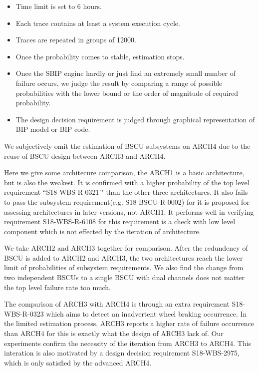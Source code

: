 \begin{itemize}
	\item Time limit is set to 6 hours.
	\item Each trace contains at least a system execution cycle.
	\item Traces are repeated in groups of 12000.
	\item Once the probability comes to stable, estimation stops.
	\item Once the SBIP engine hardly or just find an extremely small number of failure occurs, we judge the result by comparing a range of possible probabilities with the lower bound or the order of magnitude of required probability.  
	\item The design decision requirement is judged through graphical representation of BIP model or BIP code.
\end{itemize}

We subjectively omit the estimation of BSCU subsystems on ARCH4 due to the reuse of BSCU design between ARCH3 and ARCH4.

Here we give some architecure comparison, the ARCH1 is a basic architecture, but is also the weakest. It is confirmed with a higher probability of the top level requirement ``S18-WBS-R-0321'" than the other three architectures. It also fails to pass the subsystem requirement(e.g. S18-BSCU-R-0002) for it is proposed for assessing architectures in later versions, not ARCH1. It performs well in verifying requirement S18-WBS-R-6108 for this requirement is a check with low level component which is not effected by the iteration of architecture.

We take ARCH2 and ARCH3 together for comparison. After the redundency of BSCU is added to ARCH2 and ARCH3, the two architectures reach the lower limit of probabilities of subsystem requirements. We also find the change from two independent BSCUs to a single BSCU with dual channels does not matter the top level failure rate too much.

The comparison of ARCH3 with ARCH4 is through an extra requirement S18-WBS-R-0323 which aims to detect an inadvertent wheel braking occurrence. In the limited estimation process, ARCH3 reports a higher rate of failure occurrence than ARCH4 for this is exactly what the design of ARCH3 lack of. Our experiments confirm the necessity of the iteration from ARCH3 to ARCH4. This interation is also motivated by a design decision requirement S18-WBS-2975, which is only satisfied by the advanced ARCH4. 

